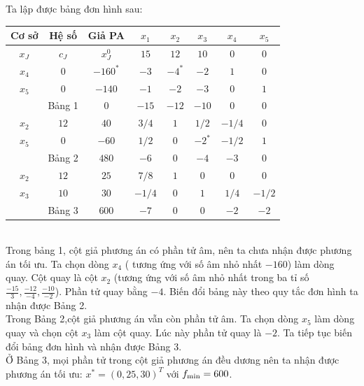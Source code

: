 \documentclass[12pt,a4paper]{report}
\begin{document}
\begin{itemize}
    Ta lập được bảng đơn hình sau:\\
    \begin{tabular}{|c|c|c|c|c|c|c|c|}
       \hline
       Cơ sở  & Hệ số & Giả PA& $x_1$ & $x_2$ & $x_3$ &$x_4$ & $x_5$ \\
       \hline
        $x_J$ & $c_J$ & $x_J^0$ & $15$ &$12$ &$10$ &$0$ &$0$ \\
        \hline
        $x_4$ & $0$ & $-160^*$ & $-3$ &$-4^*$ &$-2$ &$1$ &$0$\\
        $x_5$ & $0$ & $-140$ &$-1$ &$-2$ &$-3$ &$0$ &$1$\\
        \hline
        &Bảng 1 & $0$ & $-15$ &$-12$ &$-10$ &$0$ &$0$\\
        \hline
        $x_2$& $12$ &$40$ & $3/4$ &$1$ &$1/2$ &$-1/4$ &$0$\\
        $x_5$ &$0$ & $-60$ &$1/2$ &$0$ &$-2^*$ &$-1/2$ &$1$\\
        \hline
        &Bảng 2& $480$ &$-6$ &$0$ &$-4$ &$-3$ &$0$\\
        \hline
        $x_2$ &$12$ &$25$ &$7/8$ & $1$ &$0$ &$0 $ &$0$\\
        $x_3$ &$10$ &$30$ &$-1/4$ &$0$ &$1$ &$1/4$ &$-1/2$\\
        \hline
        &Bảng 3& $600$ &$-7$ &$0 $ &$0$ &$-2$ &$-2$\\
        \hline
    \end{tabular}\\
      Trong bảng 1, cột giả phương án có phần tử âm, nên ta chưa nhận được phương án tối ưu. Ta chọn dòng $x_4$  ( tương ứng với số âm nhỏ nhất $-160$) làm dòng quay. Cột quay là cột $x_2$ (tương ứng với số âm nhỏ nhất trong ba tỉ số $\frac{-15}{3},\frac{-12}{-4},\frac{-10}{-2}$). Phần tử quay bằng $-4$. Biến đổi bảng này theo quy tắc đơn hình ta nhận được Bảng 2.\\
    Trong Bảng 2,cột giả phương án vẫn còn phần tử âm. Ta chọn dòng $x_5$ làm dòng quay và chọn cột $x_3$ làm cột quay. Lúc này phần tử quay là $-2$. Ta tiếp tục biến đổi bảng đơn hình và nhận được Bảng 3. \\
    Ở Bảng 3, mọi phần tử trong cột giả phương án đều dương nên ta nhận được phương án tối ưu: $x^*=(0,25,30)^T$ với $f_{\rm{min}}=600$.\\
    
\end{itemize}
\end{document}
